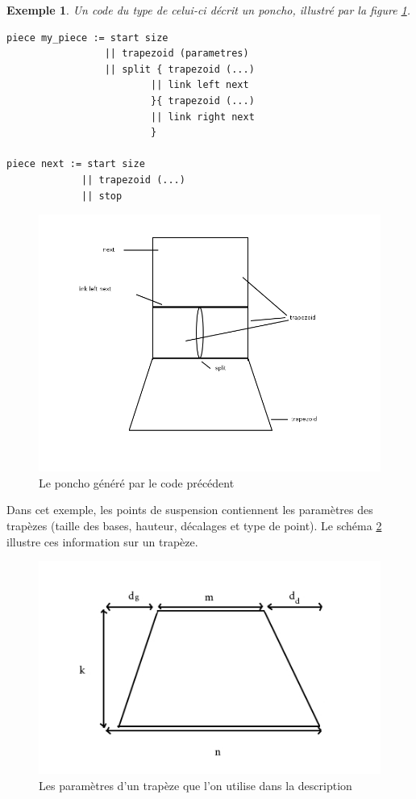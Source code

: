 \documentclass{article}
\newtheorem{ex}{Exemple}
\begin{document}
\begin{ex}
   Un code du type de celui-ci décrit un poncho, illustré par la figure \ref{poncho}.
\end{ex}

\begin{lstlisting}
piece my_piece := start size
                 || trapezoid (parametres) 
                 || split { trapezoid (...)
                         || link left next
                         }{ trapezoid (...)
                         || link right next
                         }

piece next := start size
             || trapezoid (...)
             || stop
\end{lstlisting}

\begin{figure}[!ht]
  \centering
  \includegraphics[scale=0.4]{../img/poncho.png}
  \caption{Le poncho généré par le code précédent}
  \label{poncho}
\end{figure}


Dans cet exemple, les points de suspension contiennent les paramètres des trapèzes (taille des bases, hauteur, décalages et type de point). Le schéma \ref{trapeze} illustre ces information sur un trapèze.

\begin{figure}[!ht]
  \centering
  \includegraphics[scale=0.5]{../img/trapeze.jpg}
  \caption{Les paramètres d'un trapèze que l'on utilise dans la description}
  \label{trapeze}
\end{figure}
\end{document}
